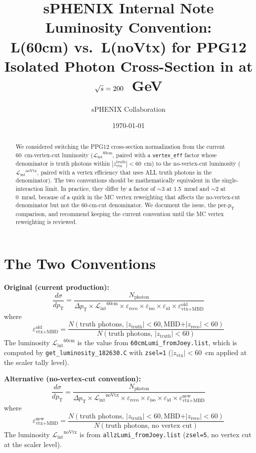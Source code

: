 \documentclass[11pt,letterpaper]{article}
\title{%
  \vspace{-1cm}
  {\large \textbf{sPHENIX Internal Note}}\\[0.5cm]
  {\LARGE \textbf{Luminosity Convention:\\
  L(60cm) vs.\ L(noVtx) for PPG12}}\\[0.3cm]
  {\large Isolated Photon Cross-Section in \pp{} at $\mbox{$\sqrt{s}$} = 200$~GeV}
}
\author{sPHENIX Collaboration}
\date{\today}
\newcommand{\pT}{\ensuremath{p_{\text{T}}}}
\newcommand{\Lint}{\ensuremath{\mathcal{L}_{\text{int}}}}
\begin{document}
\maketitle

\begin{abstract}
We considered switching the PPG12 cross-section normalization from the
current 60~cm-vertex-cut luminosity ($\Lint^{60\text{cm}}$, paired with a
\texttt{vertex\_eff} factor whose denominator is truth photons within
$|z_{\text{vtx}}^{\text{truth}}|<60$~cm) to the no-vertex-cut luminosity
($\Lint^{\text{noVtx}}$, paired with a vertex efficiency that uses ALL
truth photons in the denominator). The two conventions should be
mathematically equivalent in the single-interaction limit. In practice,
they differ by a factor of $\sim 3$ at 1.5~mrad and $\sim 2$ at 0~mrad,
because of a quirk in the MC vertex reweighting that affects the
no-vertex-cut denominator but not the 60-cm-cut denominator. We document
the issue, the per-$\pT$ comparison, and recommend keeping the current
convention until the MC vertex reweighting is reviewed.
\end{abstract}

\section{The Two Conventions}
\label{sec:conventions}

\textbf{Original (current production):}
\begin{equation}
  \frac{d\sigma}{d\pT} = \frac{N_{\text{photon}}}{\Delta\pT \times
  \Lint^{60\text{cm}} \times \varepsilon_{\text{reco}} \times
  \varepsilon_{\text{iso}} \times \varepsilon_{\text{id}} \times
  \varepsilon_{\text{vtx+MBD}}^{\text{old}}}
\end{equation}
where
\begin{equation}
  \varepsilon_{\text{vtx+MBD}}^{\text{old}} = \frac{N(\text{truth photons, }|z_{\text{truth}}|<60, \text{MBD+}|z_{\text{reco}}|<60)}{N(\text{truth photons, }|z_{\text{truth}}|<60)}
\end{equation}
The luminosity $\Lint^{60\text{cm}}$ is the value from
\texttt{60cmLumi\_fromJoey.list}, which is computed by
\texttt{get\_luminosity\_182630.C} with \texttt{zsel=1} ($|z_{\text{vtx}}|<60$~cm
applied at the scaler tally level).

\textbf{Alternative (no-vertex-cut convention):}
\begin{equation}
  \frac{d\sigma}{d\pT} = \frac{N_{\text{photon}}}{\Delta\pT \times
  \Lint^{\text{noVtx}} \times \varepsilon_{\text{reco}} \times
  \varepsilon_{\text{iso}} \times \varepsilon_{\text{id}} \times
  \varepsilon_{\text{vtx+MBD}}^{\text{new}}}
\end{equation}
where
\begin{equation}
  \varepsilon_{\text{vtx+MBD}}^{\text{new}} = \frac{N(\text{truth photons, }|z_{\text{truth}}|<60, \text{MBD+}|z_{\text{reco}}|<60)}{N(\text{truth photons, no vertex cut})}
\end{equation}
The luminosity $\Lint^{\text{noVtx}}$ is from \texttt{allzLumi\_fromJoey.list}
(\texttt{zsel=5}, no vertex cut at the scaler level).
\end{document}
